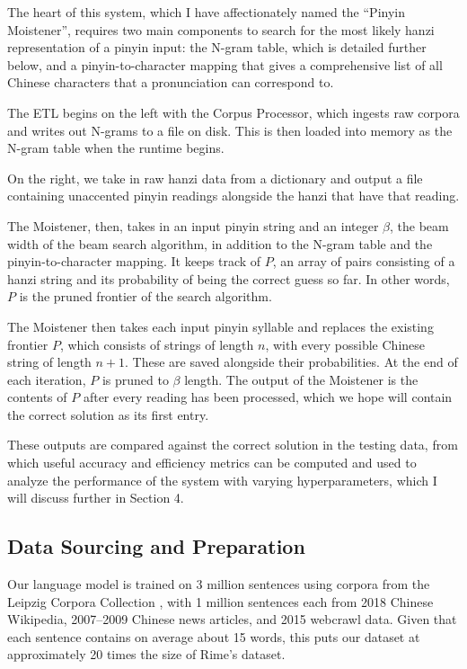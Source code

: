 \documentclass[11pt]{ctexart}
\begin{document}
The heart of this system, which I have affectionately named the ``Pinyin Moistener'',
requires
two main components to search for the most likely hanzi 
representation of a pinyin input: the N-gram table, which is detailed
further below, and a pinyin-to-character mapping that gives a comprehensive
list of all Chinese characters that a pronunciation can correspond to.

The ETL begins on the left with the Corpus Processor, which ingests raw corpora
and writes out N-grams to a file on disk. This is then loaded into 
memory as the N-gram table when the runtime begins.


On the right, we take in raw hanzi data from a dictionary
and output a file
containing unaccented pinyin readings alongside the hanzi that have
that reading.

The Moistener, then, takes in an input pinyin string and an integer $\beta$, the beam width of the beam search algorithm, in addition to the N-gram table and the pinyin-to-character mapping. It keeps track of $P$, an array of pairs consisting of a hanzi string and its probability of being the correct guess so far. In other words, $P$ is the pruned frontier of the search algorithm. 

The Moistener then takes each input pinyin syllable and replaces the existing frontier $P$, which consists of strings of length $n$, with every possible Chinese string of length $n+1$. These are saved alongside their probabilities. At the end of each iteration, $P$ is pruned to $\beta$ length. The output of the Moistener is the contents of $P$ after every reading has been processed, which we hope will contain the correct solution as its first entry.

These outputs are compared against the correct solution in the testing data, from which useful accuracy and efficiency metrics can be computed and used to analyze the performance of the system with varying hyperparameters, which I will discuss further in Section 4. 

\subsection{Data Sourcing and Preparation}

Our language model is trained on 3 million sentences using corpora from the Leipzig
Corpora Collection \cite{corpus}, with 1 million sentences each from 2018 Chinese Wikipedia, 
2007--2009 Chinese news articles, and 2015 webcrawl data. Given that each sentence
contains on average about 15 words, this puts our dataset at approximately
20 times the size of Rime's dataset.
\end{document}
